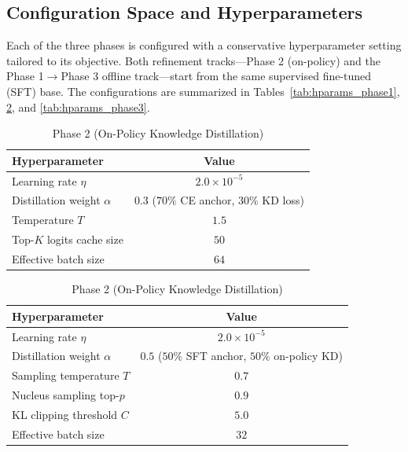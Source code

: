 \subsection{Configuration Space and Hyperparameters}

Each of the three phases is configured with a conservative hyperparameter setting tailored to its objective. Both refinement tracks---Phase 2 (on-policy) and the Phase 1$\rightarrow$Phase 3 offline track---start from the same supervised fine-tuned (SFT) base. The configurations are summarized in Tables~\ref{tab:hparams_phase1}, \ref{tab:hparams_phase2}, and \ref{tab:hparams_phase3}.

\begin{table}[htbp]
\centering
\caption{Hyperparameter configurations across the three training phases.}
\label{tab:hparams}

\begin{subtable}{\linewidth}
\centering
\caption{Phase 1 (Offline Logit Distillation)}
\label{tab:hparams_phase1}
\begin{tabular}{lc}
\hline
\textbf{Hyperparameter} & \textbf{Value} \\ \hline
Learning rate $\eta$    & $2.0 \times 10^{-5}$ \\
Distillation weight $\alpha$ & $0.3$ ($70\%$ CE anchor, $30\%$ KD loss) \\
Temperature $T$         & $1.5$ \\
Top-$K$ logits cache size & $50$ \\
Effective batch size    & $64$ \\ \hline
\end{tabular}
\end{subtable}

\vspace{1.5em}

\begin{subtable}{\linewidth}
\centering
\caption{Phase 2 (On-Policy Knowledge Distillation)}
\label{tab:hparams_phase2}
\begin{tabular}{lc}
\hline
\textbf{Hyperparameter} & \textbf{Value} \\ \hline
Learning rate $\eta$    & $2.0 \times 10^{-5}$ \\
Distillation weight $\alpha$ & $0.5$ ($50\%$ SFT anchor, $50\%$ on-policy KD) \\
Sampling temperature $T$ & $0.7$ \\
Nucleus sampling top-$p$ & $0.9$ \\
KL clipping threshold $C$ & $5.0$ \\
Effective batch size    & $32$ \\ \hline
\end{tabular}
\end{subtable}


\end{table}
